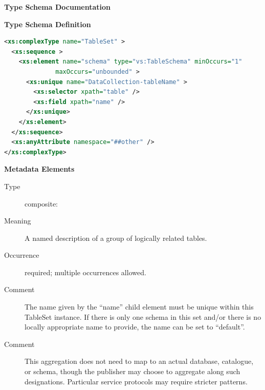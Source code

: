 \documentclass[11pt,a4paper]{ivoa}
\begin{document}
\begin{generated}
\begingroup
        \renewcommand*\descriptionlabel[1]{%
        \hbox to 5.5em{\emph{#1}\hfil}}\vspace{2ex}\noindent\textbf{ Type Schema Documentation}


\vspace{1ex}\noindent\textbf{ Type Schema Definition}

\begin{lstlisting}[language=XML,basicstyle=\footnotesize]
<xs:complexType name="TableSet" >
  <xs:sequence >
    <xs:element name="schema" type="vs:TableSchema" minOccurs="1"
              maxOccurs="unbounded" >
      <xs:unique name="DataCollection-tableName" >
        <xs:selector xpath="table" />
        <xs:field xpath="name" />
      </xs:unique>
    </xs:element>
  </xs:sequence>
  <xs:anyAttribute namespace="##other" />
</xs:complexType>
\end{lstlisting}

\vspace{0.5ex}\noindent\textbf{ Metadata Elements}

\begingroup\small\begin{bigdescription}\item[Element \xmlel{schema}]
\begin{description}
\item[Type] composite: 
\item[Meaning] A named description of a group of logically related tables.
\item[Occurrence] required; multiple occurrences allowed.
\item[Comment] The name given by the “name” child element must
                be unique within this TableSet instance.  If there is
                only one schema in this set and/or there is no locally
                appropriate name to provide, the name can be set to
                “default”.
\item[Comment] This aggregation does not need to map to an
                actual database, catalogue, or schema, though the
                publisher may choose to aggregate along such
                designations.  Particular service protocols may
                require stricter patterns.

\end{description}


\end{bigdescription}\endgroup

\endgroup
\end{generated}
\end{document}
